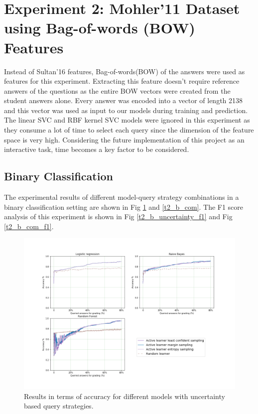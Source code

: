 	\clearpage
	
 \section{Experiment 2: Mohler'11 Dataset using Bag-of-words (BOW) Features}
 
 Instead of Sultan'16 features, Bag-of-words(BOW) of the answers were used as features for this experiment. Extracting this feature doesn't require reference answers of the questions as the entire BOW vectors were created from the student answers alone. Every answer was encoded into a vector of length 2138 and this vector was used as input to our models during training and prediction. The linear SVC and RBF kernel SVC models were ignored in this experiment as they consume a lot of time to select each query since the dimension of the feature space is very high. Considering the future implementation of this project as an interactive task, time becomes a key factor to be considered.   
 
 \subsection{Binary Classification}
 
 The experimental results of different model-query strategy combinations in a binary classification setting are shown in Fig \ref{t2_b_uncertainty} and \ref{t2_b_com}. The F1 score analysis of this experiment is shown in Fig \ref{t2_b_uncertainty_f1} and Fig \ref{t2_b_com_f1}. 
 
 \begin{figure}[!htb]
 	\centering
 	\includegraphics[scale=0.46]{images/binary/task2_accuracy_uncertainty}
 	\caption{Results in terms of accuracy for different models with uncertainty based query strategies.}
 	\label{t2_b_uncertainty}
 \end{figure}
 

